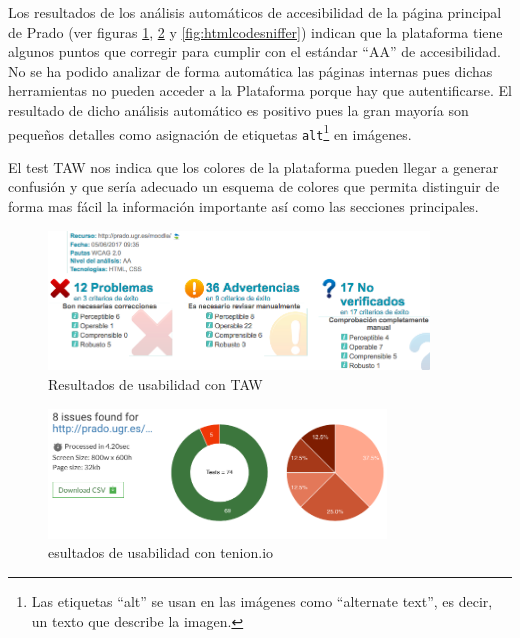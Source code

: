 Los resultados de los análisis automáticos de accesibilidad de la página principal de Prado (ver figuras \ref{fig:tawdis}, \ref{fig:tenon} y \ref{fig:htmlcodesniffer}) indican que la plataforma tiene algunos puntos que corregir para cumplir con el estándar ``AA'' de accesibilidad. No se ha podido analizar de forma automática las páginas internas pues dichas herramientas no pueden acceder a la Plataforma porque hay que autentificarse. El resultado de dicho análisis automático es positivo pues la gran mayoría son pequeños detalles como asignación de etiquetas \texttt{alt}\footnote{Las etiquetas ``alt'' se usan en las imágenes como ``alternate text'', es decir, un texto que describe la imagen.} en imágenes.

\bigskip
El test TAW nos indica que los colores de la plataforma pueden llegar a generar confusión y que sería adecuado un esquema de colores que permita distinguir de forma mas fácil la información importante así como las secciones principales.

\begin{figure}[H]
\centering
\includegraphics[width=0.9\textwidth]{../screenshots/tawdis}
\caption{Resultados de usabilidad con TAW}
\label{fig:tawdis}
\end{figure}

\begin{figure}[H]
\centering
\includegraphics[width=0.8\textwidth]{../screenshots/tenon}
\caption{esultados de usabilidad con tenion.io}
\label{fig:tenon}
\end{figure}

